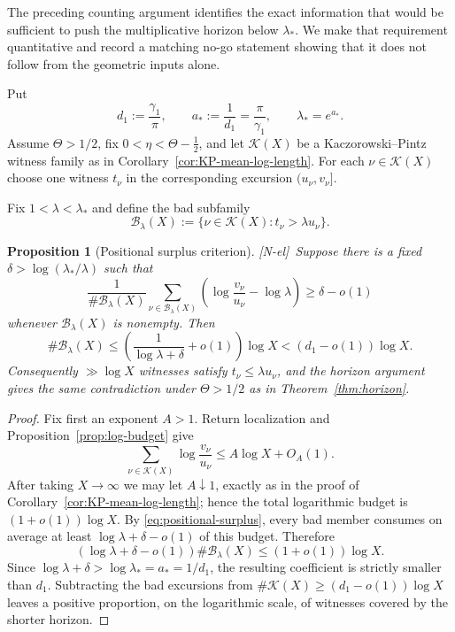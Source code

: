 \documentclass[11pt,reqno]{amsart}
\numberwithin{equation}{section}
\theoremstyle{plain}
\newtheorem{proposition}[theorem]{Proposition}
\theoremstyle{definition}
\theoremstyle{remark}
\newcommand{\tagNE}{\textup{[N-el]}}
\begin{document}
The preceding counting argument identifies the exact information that would
be sufficient to push the multiplicative horizon below $\lambda_*$.  We make
that requirement quantitative and record a matching no-go statement showing
that it does not follow from the geometric inputs alone.

Put
\begin{equation}
d_1:=\frac{\gamma_1}{\pi},\qquad
a_*:=\frac1{d_1}=\frac{\pi}{\gamma_1},\qquad
\lambda_*=e^{a_*}.
\end{equation}
Assume $\Theta>1/2$, fix $0<\eta<\Theta-\frac12$, and let
$\mathcal K(X)$ be a Kaczorowski--Pintz witness family as in
Corollary~\ref{cor:KP-mean-log-length}.  For each
$\nu\in\mathcal K(X)$ choose one witness $t_\nu$ in the corresponding
excursion $(u_\nu,v_\nu]$.

Fix $1<\lambda<\lambda_*$ and define the bad subfamily
\begin{equation}
\mathcal B_\lambda(X)
:=\{\nu\in\mathcal K(X):t_\nu>\lambda u_\nu\}.
\end{equation}

\begin{proposition}[Positional surplus criterion]
\label{prop:positional-surplus}
\tagNE\ Suppose there is a fixed $\delta>\log(\lambda_*/\lambda)$ such that
\begin{equation}
\label{eq:positional-surplus}
\frac1{\#\mathcal B_\lambda(X)}
\sum_{\nu\in\mathcal B_\lambda(X)}
\left(\log\frac{v_\nu}{u_\nu}-\log\lambda\right)
\ge \delta-o(1)
\end{equation}
whenever $\mathcal B_\lambda(X)$ is nonempty.  Then
\begin{equation}
\#\mathcal B_\lambda(X)
\le\left(\frac1{\log\lambda+\delta}+o(1)\right)\log X
<(d_1-o(1))\log X.
\end{equation}
Consequently $\gg\log X$ witnesses satisfy $t_\nu\le\lambda u_\nu$, and
the horizon argument gives the same contradiction under $\Theta>1/2$ as in
Theorem~\ref{thm:horizon}.
\end{proposition}

\begin{proof}
Fix first an exponent $A>1$.  Return localization and
Proposition~\ref{prop:log-budget} give
\begin{equation}
\sum_{\nu\in\mathcal K(X)}\log\frac{v_\nu}{u_\nu}
\le A\log X+O_A(1).
\end{equation}
After taking $X\to\infty$ we may let $A\downarrow1$, exactly as in the proof
of Corollary~\ref{cor:KP-mean-log-length}; hence the total logarithmic budget
is $(1+o(1))\log X$.  By \eqref{eq:positional-surplus}, every bad member
consumes on average at least
$\log\lambda+\delta-o(1)$ of this budget.  Therefore
\begin{equation}
(\log\lambda+\delta-o(1))\#\mathcal B_\lambda(X)
\le(1+o(1))\log X.
\end{equation}
Since
$\log\lambda+\delta>\log\lambda_*=a_*=1/d_1$, the resulting coefficient is
strictly smaller than $d_1$.  Subtracting the bad excursions from
$\#\mathcal K(X)\ge(d_1-o(1))\log X$ leaves a positive proportion, on the
logarithmic scale, of witnesses covered by the shorter horizon.
\end{proof}
\end{document}
